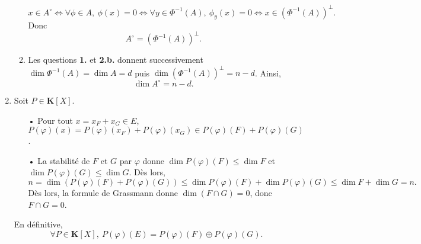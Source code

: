\documentclass[a4paper,11pt]{article}
\newcommand{\K}{\mathbf{K}}
\begin{document}
\begin{enumerate}
\begin{enumerate}
\[x\in A^\circ\Leftrightarrow\forall\phi\in A,\ \phi(x)=0
\Leftrightarrow\forall y\in\Phi^{-1}(A),\ \phi_y(x)=0
\Leftrightarrow x\in\left(\Phi^{-1}(A)\right)^\perp .
\]
Donc
\[\boxed{A^\circ=\left(\Phi^{-1}(A)\right)^\perp.}\]
\item Les questions {\sffamily\bfseries 1.} et {\sffamily\bfseries 2.b.} donnent successivement $\dim\Phi^{-1}(A)=\dim A=d$ puis $\dim\left(\Phi^{-1}(A)\right)^\perp=n-d$. Ainsi,
\[\boxed{\dim A^\circ=n-d.}\]
\end{enumerate}
\item Soit $P\in\K[X]$.
\begin{itemize}
\item[•] Pour tout $x=x_F+x_G\in E$, $P(\varphi)(x)=P(\varphi)(x_F)+P(\varphi)(x_G)\in P(\varphi)(F)+P(\varphi)(G)$.
\item[•] La stabilité de $F$ et $G$ par $\varphi$ donne $\dim P(\varphi)(F)\leq \dim F$ et $\dim P(\varphi)(G)\leq \dim G$. Dès lors, \[n=\dim(P(\varphi)(F)+P(\varphi)(G))\leq\dim P(\varphi)(F)+\dim P(\varphi)(G)\leq\dim F+\dim G=n.\]
Dès lors, la formule de Grassmann donne $\dim(F\cap G)=0$, donc $F\cap G=0$.
\end{itemize}
En définitive,
\[\boxed{\forall P\in\K[X],\ P(\varphi)(E)=P(\varphi)(F)\oplus P(\varphi)(G).}\]
\end{enumerate}
\end{document}
